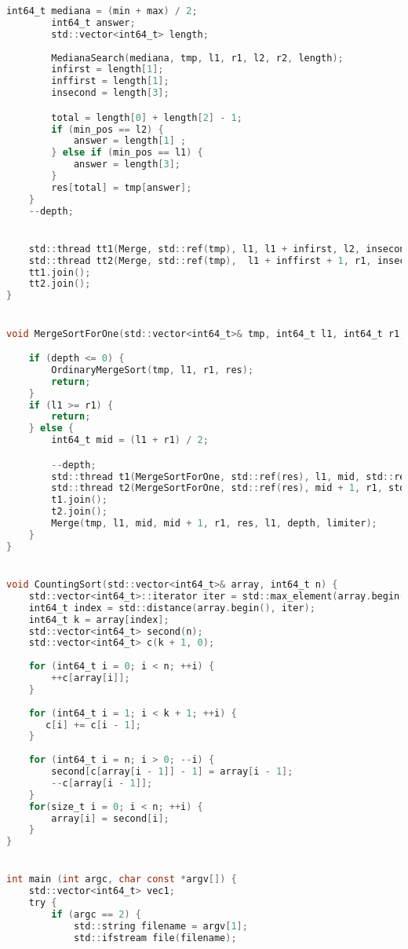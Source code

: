 \begin{lstlisting}[language=C]
        int64_t mediana = (min + max) / 2;
        int64_t answer;
        std::vector<int64_t> length;
        
        MedianaSearch(mediana, tmp, l1, r1, l2, r2, length);
        infirst = length[1];
        inffirst = length[1];
        insecond = length[3];

        total = length[0] + length[2] - 1;
        if (min_pos == l2) {
            answer = length[1] ;
        } else if (min_pos == l1) {
            answer = length[3];
        }
        res[total] = tmp[answer];
    }
    --depth;


    std::thread tt1(Merge, std::ref(tmp), l1, l1 + infirst, l2, insecond , std::ref(res), lres, depth, limiter);
    std::thread tt2(Merge, std::ref(tmp),  l1 + inffirst + 1, r1, insecond + 1, r2, std::ref(res), total + 1 , depth, limiter);
    tt1.join();
    tt2.join();
}


void MergeSortForOne(std::vector<int64_t>& tmp, int64_t l1, int64_t r1, std::vector<int64_t>& res, int64_t depth, bool limiter) {

    if (depth <= 0) {
        OrdinaryMergeSort(tmp, l1, r1, res);
        return;
    }
    if (l1 >= r1) {
        return;
    } else {
        int64_t mid = (l1 + r1) / 2;

        --depth;
        std::thread t1(MergeSortForOne, std::ref(res), l1, mid, std::ref(tmp), depth, limiter);
        std::thread t2(MergeSortForOne, std::ref(res), mid + 1, r1, std::ref(tmp), depth, limiter);
        t1.join();
        t2.join();
        Merge(tmp, l1, mid, mid + 1, r1, res, l1, depth, limiter);
    }
}


void CountingSort(std::vector<int64_t>& array, int64_t n) {
    std::vector<int64_t>::iterator iter = std::max_element(array.begin(), array.end());
    int64_t index = std::distance(array.begin(), iter);
    int64_t k = array[index];
    std::vector<int64_t> second(n);
    std::vector<int64_t> c(k + 1, 0);
 
    for (int64_t i = 0; i < n; ++i) {
        ++c[array[i]];
    }
   
    for (int64_t i = 1; i < k + 1; ++i) {
       c[i] += c[i - 1];
    }
  
    for (int64_t i = n; i > 0; --i) {
        second[c[array[i - 1]] - 1] = array[i - 1];
        --c[array[i - 1]];
    }
    for(size_t i = 0; i < n; ++i) {
        array[i] = second[i];
    }
}


int main (int argc, char const *argv[]) {
    std::vector<int64_t> vec1;
    try {
        if (argc == 2) {
            std::string filename = argv[1];
            std::ifstream file(filename);


\end{lstlisting}
